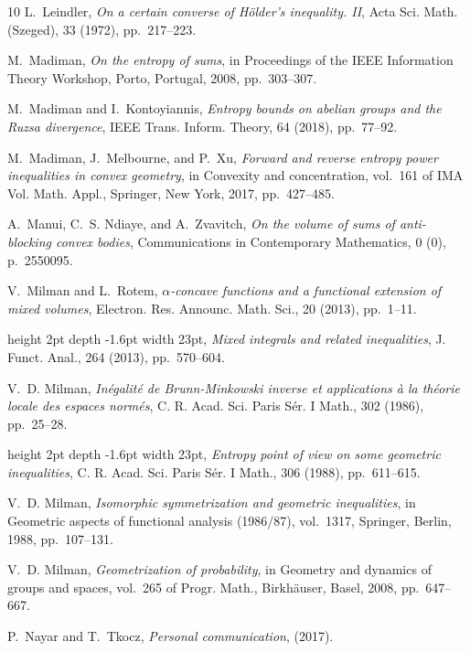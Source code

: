 \documentclass[11pt]{amsart}
\theoremstyle{plain}
\theoremstyle{definition}
\theoremstyle{remark}
\begin{document}
\begin{thebibliography}{10}
{\sc L.~Leindler}, {\em On a certain converse of {H}\"older's inequality. {II}}, Acta Sci. Math. (Szeged), 33 (1972), pp.~217--223.

{\sc M.~Madiman}, {\em On the entropy of sums}, in Proceedings of the IEEE Information Theory Workshop, Porto, Portugal, 2008, pp.~303--307.

{\sc M.~Madiman and I.~Kontoyiannis}, {\em {Entropy bounds on abelian groups and the Ruzsa divergence}}, IEEE Trans. Inform. Theory, 64 (2018), pp.~77--92.

{\sc M.~Madiman, J.~Melbourne, and P.~Xu}, {\em Forward and reverse entropy power inequalities in convex geometry}, in Convexity and concentration, vol.~161 of IMA Vol. Math. Appl., Springer, New York, 2017, pp.~427--485.

{\sc A.~Manui, C.~S. Ndiaye, and A.~Zvavitch}, {\em On the volume of sums of anti-blocking convex bodies}, Communications in Contemporary Mathematics, 0 (0), p.~2550095.

{\sc V.~Milman and L.~Rotem}, {\em {$\alpha$}-concave functions and a functional extension of mixed volumes}, Electron. Res. Announc. Math. Sci., 20 (2013), pp.~1--11.

\leavevmode\vrule height 2pt depth -1.6pt width 23pt, {\em Mixed integrals and related inequalities}, J. Funct. Anal., 264 (2013), pp.~570--604.

{\sc V.~D. Milman}, {\em In\'egalit\'e{} de {B}runn-{M}inkowski inverse et applications \`a{} la th\'eorie locale des espaces norm\'es}, C. R. Acad. Sci. Paris S\'er. I Math., 302 (1986), pp.~25--28.

\leavevmode\vrule height 2pt depth -1.6pt width 23pt, {\em Entropy point of view on some geometric inequalities}, C. R. Acad. Sci. Paris S\'er. I Math., 306 (1988), pp.~611--615.

{\sc V.~D. Milman}, {\em Isomorphic symmetrization and geometric inequalities}, in Geometric aspects of functional analysis (1986/87), vol.~1317, Springer, Berlin, 1988, pp.~107--131.

{\sc V.~D. Milman}, {\em Geometrization of probability}, in Geometry and dynamics of groups and spaces, vol.~265 of Progr. Math., Birkh\"auser, Basel, 2008, pp.~647--667.

{\sc P.~Nayar and T.~Tkocz}, {\em Personal communication},  (2017).


\end{thebibliography}
\end{document}
